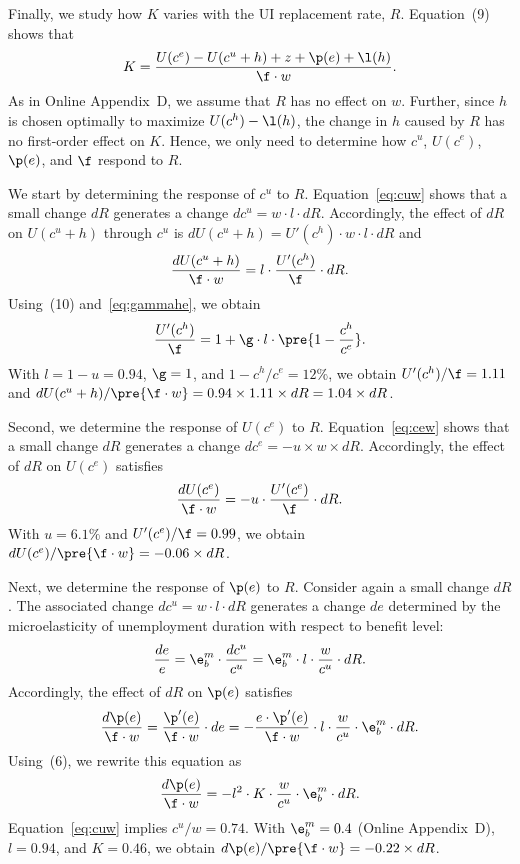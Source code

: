 \documentclass[letterpaper,12pt,leqno]{article}
\begin{document}
Finally, we study how $K$ varies with the UI replacement rate, $R$. Equation~(9) shows that
\begin{equation*}
K = \frac{U(c^{e})-U(c^{u}+h) +  z + \p(e) + \l(h)}{\f\cdot w}.
\end{equation*}
As in Online Appendix~D, we assume that $R$ has no effect on $w$. Further, since $h$ is chosen optimally to maximize $U(c^{h})-\l(h)$, the change in $h$ caused by $R$ has no first-order effect on $K$. Hence, we only need to determine how $c^u$, $U(c^e)$, $\p(e)$, and $\f$ respond to $R$.

We start by determining the response of $c^{u}$ to $R$. Equation~\eqref{eq:cuw} shows that a small change $dR$ generates a change $dc^{u}=w\cdot l \cdot dR$. Accordingly, the effect of $dR$ on $U(c^{u}+h)$ through $c^{u}$ is $dU(c^{u}+h)=U'(c^{h})\cdot w \cdot l \cdot dR$ and
\begin{equation}
\frac{dU(c^{u}+h)}{\f\cdot w} = l\cdot\frac{U'(c^{h})}{\f}\cdot dR.
\label{eq:duch}\end{equation} 
Using~(10) and~\eqref{eq:gammahe}, we obtain
\begin{equation}
\frac{U'(c^{h})}{\f} = 1+\g\cdot l\cdot \pre{1-\frac{c^{h}}{c^{e}}}. 
\label{eq:uchf}\end{equation}
With $l=1-u=0.94$, $\g=1$, and $1-c^{h}/c^{e}=12\%$, we obtain $U'(c^{h})/\f=1.11$ and $dU(c^{u}+h)/\pre{\f\cdot w} = 0.94\times 1.11\times dR = 1.04 \times dR$.

Second, we determine the response of $U(c^{e})$ to $R$. Equation~\eqref{eq:cew} shows that a small change $dR$ generates a change $d c^e = - u\times w \times dR$. Accordingly, the effect of $dR$ on $U(c^e)$ satisfies 
\begin{equation}
\frac{dU(c^e)}{\f\cdot w} = - u \cdot\frac{U'(c^e)}{\f}\cdot dR.
\label{eq:duce}\end{equation}
With $u=6.1\%$ and $U'(c^e)/\f=0.99$, we obtain $dU(c^e)/\pre{\f\cdot w} = -0.06\times dR$.

Next, we determine the response of $\p(e)$ to $R$. Consider again a small change $dR$. The associated change $dc^{u}=w\cdot l \cdot dR$ generates a change $de$ determined by the microelasticity of unemployment duration with respect to benefit level: 
\begin{equation*}
\frac{de}{e}=\e^{m}_{b} \cdot \frac{dc^{u}}{c^{u}}=\e^{m}_{b} \cdot l \cdot \frac{w}{c^{u}}\cdot dR. 
\end{equation*}
Accordingly, the effect of $dR$ on $\p(e)$ satisfies 
\begin{equation*}
\frac{d\p(e)}{\f\cdot w}=\frac{\p'(e)}{\f\cdot w}\cdot de =  -\frac{e\cdot \p'(e)}{\f\cdot w}\cdot l \cdot \frac{w}{c^{u}} \cdot \e^{m}_{b}\cdot dR.  
\end{equation*}
Using~(6), we rewrite this equation as
\begin{equation}
\frac{d\p(e)}{\f\cdot w}=-l^2 \cdot K \cdot \frac{w}{c^{u}} \cdot \e^{m}_{b}\cdot dR. 
\label{eq:dpe}\end{equation}
Equation~\eqref{eq:cuw} implies $c^{u}/w=0.74$. With $\e^{m}_{b}=0.4$ (Online Appendix~D), $l=0.94$, and $K=0.46$, we obtain $d\p(e)/\pre{\f\cdot w} = - 0.22 \times dR$.
\end{document}
